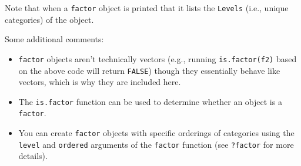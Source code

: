 \documentclass[
]{book}
\providecommand{\tightlist}{%
  \setlength{\itemsep}{0pt}\setlength{\parskip}{0pt}}
\theoremstyle{definition}
\theoremstyle{definition}
\theoremstyle{definition}
\theoremstyle{definition}
\theoremstyle{remark}
\begin{document}
Note that when a \texttt{factor} object is printed that it lists the \texttt{Levels} (i.e., unique categories) of the object.

Some additional comments:

\begin{itemize}
\tightlist
\item
  \texttt{factor} objects aren't technically vectors (e.g., running \texttt{is.factor(f2)} based on the above code will return \texttt{FALSE}) though they essentially behave like vectors, which is why they are included here.
\item
  The \texttt{is.factor} function can be used to determine whether an object is a \texttt{factor}.
\item
  You can create \texttt{factor} objects with specific orderings of categories using the \texttt{level} and \texttt{ordered} arguments of the \texttt{factor} function (see \texttt{?factor} for more details).
\end{itemize}
\end{document}
